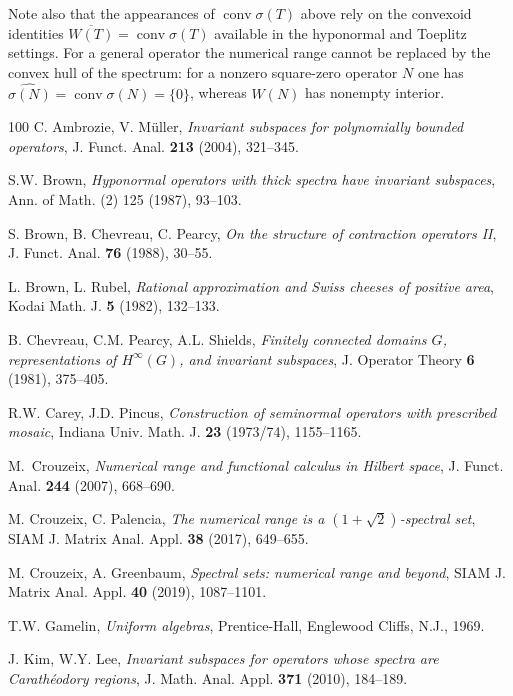 \documentclass[11pt]{amsart}
\numberwithin{equation}{section}
\theoremstyle{definition}
\theoremstyle{remark}
\DeclareMathOperator{\conv}{conv}
\begin{document}
Note also that the appearances of $\conv\sigma(T)$ above rely on the
convexoid identities $\overline{W(T)}=\conv\sigma(T)$ available in the
hyponormal and Toeplitz settings. For a general operator the numerical range
cannot be replaced by the convex hull of the spectrum: for a nonzero square-zero
operator $N$ one has $\widehat{\sigma(N)}=\conv\sigma(N)=\{0\}$, whereas
$W(N)$ has nonempty interior.


\begin{thebibliography}{100}
 C. Ambrozie, V. M\"uller, \emph{Invariant subspaces for polynomially bounded operators}, J. Funct. Anal. \textbf{213} (2004), 321--345.

 S.W. Brown, \emph{Hyponormal operators with thick spectra have invariant subspaces},
Ann. of Math. (2) 125 (1987), 93--103.
              
 S. Brown, B. Chevreau, C. Pearcy, \emph{On the structure of contraction operators II}, J. Funct. Anal. \textbf{76} (1988), 30--55.

 L. Brown, L. Rubel, \emph{Rational approximation and Swiss cheeses of positive area}, Kodai Math. J. \textbf{5} (1982), 132--133.

 B. Chevreau, C.M. Pearcy, A.L. Shields, \emph{Finitely connected domains $G$, representations of $H^\infty(G)$, and invariant subspaces}, J. Operator Theory \textbf{6} (1981), 375--405.

 R.W. Carey, J.D. Pincus, \emph{Construction of seminormal operators with prescribed mosaic}, Indiana Univ. Math. J. \textbf{23} (1973/74), 1155--1165.

M.~Crouzeix,
\emph{Numerical range and functional calculus in Hilbert space},
J. Funct. Anal. \textbf{244} (2007), 668--690.


 M. Crouzeix, C. Palencia, \emph{The numerical range is a $(1+\sqrt{2})$-spectral set}, SIAM J. Matrix Anal. Appl. \textbf{38} (2017), 649--655.

 M. Crouzeix, A. Greenbaum, \emph{Spectral sets: numerical range and beyond}, SIAM J. Matrix Anal. Appl. \textbf{40} (2019), 1087--1101.


 T.W. Gamelin, \emph{Uniform algebras}, Prentice-Hall, Englewood Cliffs, N.J., 1969.

 J. Kim, W.Y. Lee, \emph{Invariant subspaces for operators whose spectra are Carath\'eodory regions}, J. Math. Anal. Appl. \textbf{371} (2010), 184--189.


\end{thebibliography}
\end{document}
